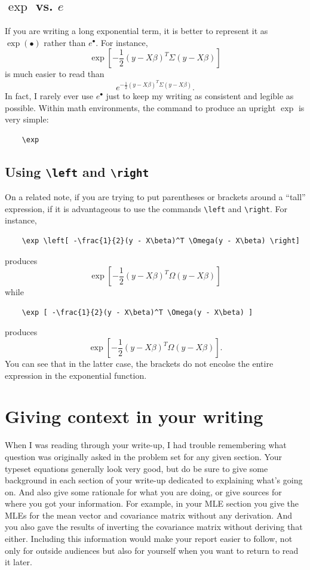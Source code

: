 \documentclass[11pt]{article}
\begin{document}
\subsection{$\exp$ vs. $e$}

If you are writing a long exponential term, it is better to represent it as $\exp(\bullet)$ rather than $e^\bullet$. For instance, $$\exp \left[ -\frac{1}{2}(y - X\beta)^T \Sigma(y - X\beta) \right]$$ is much easier to read than $$ e^{-\frac{1}{2}(y - X\beta)^T \Sigma(y - X\beta)} .$$ In fact, I rarely ever use $e^\bullet$ just to keep my writing as consistent and legible as possible. Within math environments, the command to produce an upright $\exp$ is very simple: \begin{verbatim}
	\exp
\end{verbatim}

\subsection{Using \texttt{\textbackslash left} and \texttt{\textbackslash right}}

On a related note, if you are trying to put parentheses or brackets around a ``tall'' expression, if it is advantageous to use the commands \texttt{\textbackslash left} and \texttt{\textbackslash right}. For instance, \begin{verbatim}
	\exp \left[ -\frac{1}{2}(y - X\beta)^T \Omega(y - X\beta) \right]
\end{verbatim}
%
produces $$ \exp \left[ -\frac{1}{2}(y - X\beta)^T \Omega(y - X\beta) \right] $$ while \begin{verbatim}
	\exp [ -\frac{1}{2}(y - X\beta)^T \Omega(y - X\beta) ]
\end{verbatim}
%
produces $$ \exp [ -\frac{1}{2}(y - X\beta)^T \Omega(y - X\beta) ]. $$ You can see that in the latter case, the brackets do not encolse the entire expression in the exponential function. 

\section{Giving context in your writing}

When I was reading through your write-up, I had trouble remembering what question was originally asked in the problem set for any given section. Your typeset equations generally look very good, but do be sure to give some background in each section of your write-up dedicated to explaining what's going on. And also give some rationale for what you are doing, or give sources for where you got your information. For example, in your MLE section you give the MLEs for the mean vector and covariance matrix without any derivation. And you also gave the results of inverting the covariance matrix without deriving that either. Including this information would make your report easier to follow, not only for outside audiences but also for yourself when you want to return to read it later. 
\end{document}
